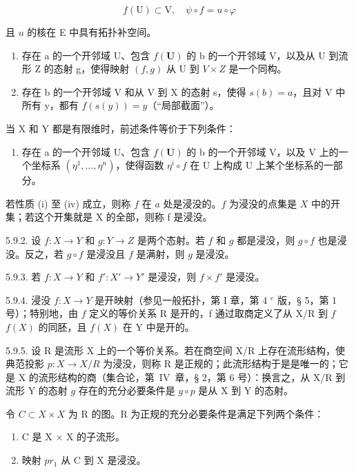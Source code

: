 \[
f (\mathrm{U}) \subset \mathrm{V}, \quad \psi \circ f = u \circ \varphi
\]

且 \(u\) 的核在 E 中具有拓扑补空间。

\begin{enumerate}
\def\labelenumi{(\roman{enumi})}
\setcounter{enumi}{2}
\item
  存在 a 的一个开邻域 U、包含 \(f(\mathbf{U})\) 的 b 的一个开邻域 V，以及从 U 到流形 Z 的态射 g，使得映射 \((f,g)\) 从 U 到 \(V \times Z\) 是一个同构。
\item
  存在 b 的一个开邻域 V 和从 V 到 X 的态射 s，使得 \(s(b) = a\)，且对 V 中所有 y，都有 \(f(s(y)) = y\)（“局部截面”）。
\end{enumerate}

当 X 和 Y 都是有限维时，前述条件等价于下列条件：

\begin{enumerate}
\def\labelenumi{(\alph{enumi})}
\setcounter{enumi}{21}
\tightlist
\item
  存在 a 的一个开邻域 U、包含 \(f(\mathbf{U})\) 的 b 的一个开邻域 V，以及 V 上的一个坐标系 \((\eta^{1},\ldots,\eta^{n})\)，使得函数 \(\eta^{i}\circ f\) 在 U 上构成 U 上某个坐标系的一部分。
\end{enumerate}

若性质 (i) 至 (iv) 成立，则称 \(f\) 在 \(a\) 处是浸没的。\(f\) 为浸没的点集是 \(X\) 中的开集；若这个开集就是 X 的全部，则称 f 是浸没。

5.9.2. 设 \(f: X \to Y\) 和 \(g: Y \to Z\) 是两个态射。若 \(f\) 和 \(g\) 都是浸没，则 \(g \circ f\) 也是浸没。反之，若 \(g \circ f\) 是浸没且 \(f\) 是满射，则 \(g\) 是浸没。

5.9.3. 若 \(f: X \to Y\) 和 \(f': X' \to Y'\) 是浸没，则 \(f \times f'\) 是浸没。

5.9.4. 浸没 \(f: X \to Y\) 是开映射（参见一般拓扑，第 I 章，第 4 \(^{e}\) 版，§ 5，第 1 号）；特别地，由 \(f\) 定义的等价关系 R 是开的，f 通过取商定义了从 X/R 到 \(f\)\(f(X)\) 的同胚，且 \(f(X)\) 在 Y 中是开的。

5.9.5. 设 R 是流形 X 上的一个等价关系。若在商空间 X/R 上存在流形结构，使典范投影 \(p: X \to X/R\) 为浸没，则称 R 是正规的；此流形结构于是是唯一的；它是 X 的流形结构的商（集合论，第~IV~章，§ 2，第 6 号）：换言之，从 X/R 到流形 Y 的态射 \(g\) 存在的充分必要条件是 \(g \circ p\) 是从 X 到 Y 的态射。

令 \(C \subset X \times X\) 为 R 的图。R 为正规的充分必要条件是满足下列两个条件：

\begin{enumerate}
\def\labelenumi{(\roman{enumi})}
\item
  C 是 X × X 的子流形。
\item
  映射 \(pr_{1}\) 从 C 到 X 是浸没。
\end{enumerate}

